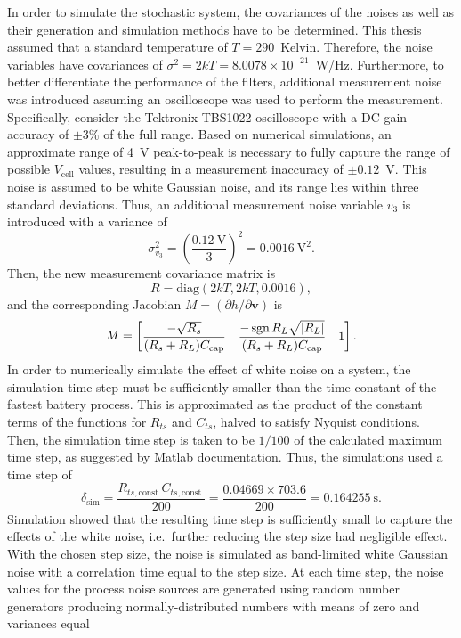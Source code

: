 \documentclass[../zhang_thesis.tex]{subfiles}
\begin{document}
In order to simulate the stochastic system, the covariances of the noises as well as their generation and simulation methods have to be determined. This thesis assumed that a standard temperature of $T=290$~Kelvin. Therefore, the noise variables have covariances of $\sigma^2=2kT=8.0078\times 10^{-21}$~W/Hz. Furthermore, to better differentiate the performance of the filters, additional measurement noise was introduced assuming an oscilloscope was used to perform the measurement.
Specifically, consider the Tektronix TBS1022 oscilloscope with a DC gain accuracy of $\pm 3\%$ of the full range. Based on numerical simulations, an approximate range of 4~V peak-to-peak is necessary to fully capture the range of possible $V_\text{cell}$ values, resulting in a measurement inaccuracy of $\pm 0.12$~V. This noise is assumed to be white Gaussian noise, and its range lies within three standard deviations. Thus, an additional measurement noise variable $v_3$ is introduced with
a variance of
\begin{equation}
    \sigma_{v_3}^2 = \left( \frac{0.12~\text{V}}{3} \right)^2 = 0.0016~\text{V}^2.
\end{equation}
Then, the new measurement covariance matrix is
\begin{equation}
    R = \mathrm{diag}(2kT,2kT,0.0016),
\end{equation}
and the corresponding Jacobian $M=(\partial h/\partial\mathbf{v})$ is
\begin{equation}
    M = \begin{bmatrix}
         \dfrac{-\sqrt{R_s}}{(R_s+R_L)C_\text{cap}} & \dfrac{-\operatorname{sgn}{R_L}\sqrt{|R_L|}}{(R_s+R_L)C_\text{cap}} & 1
        \end{bmatrix} .
\end{equation}
In order to numerically simulate the effect of white noise on a system, the simulation time step must be sufficiently smaller than the time constant of the fastest battery process. This is approximated as the product of the constant terms of the functions for $R_{ts}$ and $C_{ts}$, halved to satisfy Nyquist conditions. Then, the simulation time step is taken to be $1/100$ of the calculated maximum time step, as suggested by Matlab documentation. Thus, the simulations used a time step of
\begin{equation}
    \delta_\text{sim} = \frac{R_{ts,\text{const.}}C_{ts,\text{const.}}}{200} = \frac{0.04669\times 703.6}{200} = 0.164255~\text{s}.
\end{equation}
Simulation showed that the resulting time step is sufficiently small to capture the effects of the white noise, i.e.\ further reducing the step size had negligible effect. With the chosen step size, the noise is simulated as band-limited white Gaussian noise with a correlation time equal to the step size. At each time step, the noise values for the process noise sources are generated using random number generators producing normally-distributed numbers with means of zero and variances equal
\end{document}
